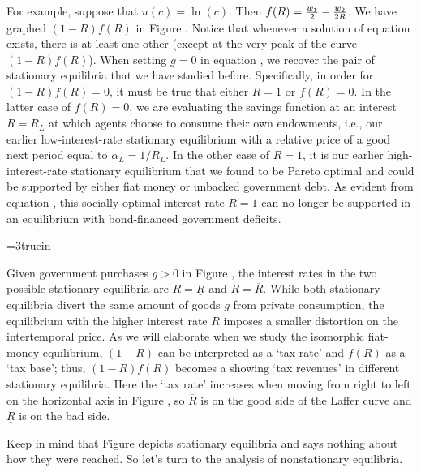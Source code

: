 For example, suppose that $u(c) = \ln(c)$.  Then
$ f(R) = {w_1 \over 2} - {w_2 \over 2 R}$.  
We have graphed $(1-R) f(R)$ in Figure . 
Notice that whenever a solution of equation  exists,  
there is at least one other (except at the very peak of
the curve $(1-R) f(R)$).
When setting $g=0$ in equation , we recover  
the pair of stationary equilibria that we have studied before. 
Specifically, in order for $(1-R) f(R)=0$, it must be true that 
either $R=1$ or $f(R)=0$. In the latter case of $f(R)=0$, we 
are evaluating the savings function at an interest $R=R_L$ at 
which agents choose to consume their own endowments, i.e., our 
earlier low-interest-rate stationary equilibrium with a relative
price of a good next period equal to $\alpha_L=1/R_L$. 
In the other case of $R=1$, it is our earlier 
high-interest-rate stationary equilibrium that we found
to be Pareto optimal and could be supported by either fiat
money or unbacked government debt. As evident from 
equation , this socially optimal interest rate
$R=1$ can no longer be supported in an equilibrium with
bond-financed government deficits. 

\centerline{\epsfxsize=3truein}
\caption{The Laffer curve in revenues from the inflation tax.}
\endfigure


Given government purchases $g>0$ in 
Figure , the interest rates in the two possible 
stationary equilibria are $R=\underline R$ and $R=\overline R$.
While both stationary equilibria divert the same amount of 
goods $g$ from private consumption, the equilibrium with the 
higher interest rate $\overline R$ imposes a smaller distortion on
the intertemporal price. As we will elaborate when we study   
 the isomorphic fiat-money equilibrium, $(1-R)$ can be 
interpreted as a `tax rate' and $f(R)$ as a `tax base'; thus, 
$(1-R) f(R)$ becomes a  showing `tax revenues'
in different stationary equilibria. Here the `tax rate' 
increases when moving from right to left on the horizontal axis 
in Figure , so 
$\overline R$ is on the good side of the Laffer curve and 
$\underline R$ is on the bad side.

Keep in mind that Figure  depicts stationary 
equilibria and says nothing about how they
were reached. So let's turn to the analysis
of nonstationary equilibria.



